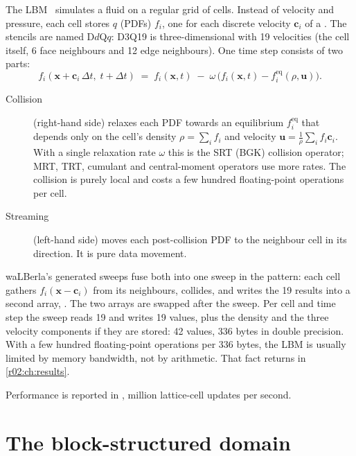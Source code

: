 The LBM~\cite{krueger-lbm} simulates a fluid on a regular grid of cells. Instead of
velocity and pressure, each cell stores $q$  (PDFs)
$f_i$, one for each discrete velocity $\mathbf{c}_i$ of a . The stencils
are named D$d$Q$q$: D3Q19 is three-dimensional with 19 velocities (the cell itself, 6
face neighbours and 12 edge neighbours). One time step consists of two parts:
\begin{equation}
  f_i(\mathbf{x} + \mathbf{c}_i\,\Delta t,\; t + \Delta t)
  \;=\; f_i(\mathbf{x}, t) \;-\; \omega\,\bigl(f_i(\mathbf{x}, t) - f_i^{\text{eq}}(\rho, \mathbf{u})\bigr).
  \label{r02:eq:lbm}
\end{equation}
\begin{description}
  \item[Collision] (right-hand side) relaxes each PDF towards an equilibrium
    $f_i^{\text{eq}}$ that depends only on the cell's density $\rho = \sum_i f_i$ and
    velocity $\mathbf{u} = \frac{1}{\rho}\sum_i f_i\mathbf{c}_i$. With a single relaxation
    rate $\omega$ this is the SRT (BGK) collision operator; MRT, TRT, cumulant and
    central-moment operators use more rates. The collision is purely local and costs a
    few hundred floating-point operations per cell.
  \item[Streaming] (left-hand side) moves each post-collision PDF to the neighbour cell in
    its direction. It is pure data movement.
\end{description}
waLBerla's generated sweeps fuse both into one  sweep in the
 pattern: each cell gathers $f_i(\mathbf{x} - \mathbf{c}_i)$ from its
neighbours, collides, and writes the 19 results into a second array, . The
two arrays are swapped after the sweep. Per cell and time step the sweep reads 19 and
writes 19 values, plus the density and the three velocity components if they are
stored: 42 values, 336 bytes in double precision. With a few hundred floating-point
operations per 336 bytes, the LBM is usually limited by memory bandwidth, not by
arithmetic. That fact returns in \cref{r02:ch:results}.

Performance is reported in , million lattice-cell updates per second.

\section{The block-structured domain}\label{r02:sec:blockforest}

